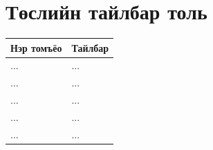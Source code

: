 \section*{Төслийн тайлбар толь}
\begin{longtable}{|p{5.5cm}|p{10cm}|}
    
    \hline
    \bfseries{Нэр томъёо} & \bfseries{Тайлбар} \\ \hline
    ... & ... \\ \hline
    ... & ... \\ \hline
    ... & ... \\ \hline
    ... & ... \\ \hline
    ... & ... \\ \hline
\end{longtable}


